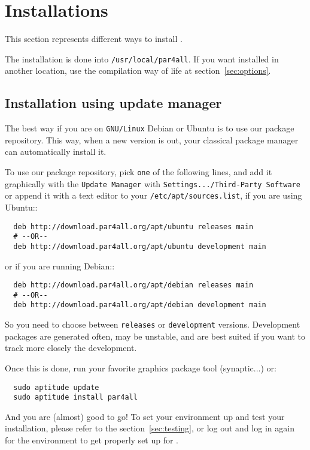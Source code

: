 \documentclass[a4paper]{article}
\begin{document}
\section{Installations}
\label{sec:installation}

This section represents different ways to install \Apfa.

The installation is done into \texttt{/usr/local/par4all}. If you want \Apfa
installed in another location, use the compilation way of life at 
section~\ref{sec:options}.

\subsection{Installation using update manager}

The best way if you are on \texttt{GNU/Linux} Debian or Ubuntu is to use
our package repository. This way, when a new version is out, your
classical package manager can automatically install it.

To use our package repository, pick \texttt{one} of the following lines, and
add it graphically with the \texttt{Update Manager} with
\texttt{Settings.../Third-Party Software} or append it with a text editor to
your \texttt{/etc/apt/sources.list}, if you are using Ubuntu::

\begin{verbatim}
  deb http://download.par4all.org/apt/ubuntu releases main
  # --OR--
  deb http://download.par4all.org/apt/ubuntu development main
\end{verbatim}

or if you are running Debian::
\begin{verbatim}
  deb http://download.par4all.org/apt/debian releases main
  # --OR--
  deb http://download.par4all.org/apt/debian development main
\end{verbatim}

So you need to choose between \texttt{releases} or \texttt{development}
versions. Development packages are generated often, may be unstable, and
are best suited if you want to track more closely the \Apfa development.

Once this is done, run your favorite graphics package tool
(synaptic...) or:
\begin{verbatim}
  sudo aptitude update
  sudo aptitude install par4all
\end{verbatim}

And you are (almost) good to go! To set your environment up and test your \Apfa
installation, please refer to the section~\ref{sec:testing}, 
or log out and log in again for the environment to get properly set
up for \Apfa.
\end{document}
